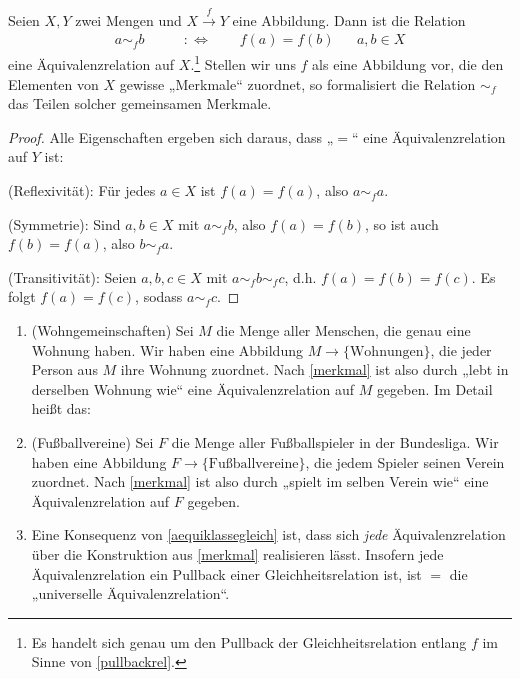 \begin{bem} \label{merkmal}
    Seien $X,Y$ zwei Mengen und $X\xrightarrow{f} Y$ eine Abbildung. Dann ist die Relation
    \begin{align*}
        a \sim_f b \qquad&:\Leftrightarrow\qquad f(a)=f(b) && a,b\in X
    \end{align*}
    eine Äquivalenzrelation auf $X$.\footnote{Es handelt sich genau um den Pullback der Gleichheitsrelation entlang $f$ im Sinne von \cref{pullbackrel}.} Stellen wir uns $f$ als eine Abbildung vor, die den Elementen von $X$ gewisse „Merkmale“ zuordnet, so formalisiert die Relation $\sim_f$ das Teilen solcher gemeinsamen Merkmale.
\end{bem}
\begin{proof}
    Alle Eigenschaften ergeben sich daraus, dass „$=$“ eine Äquivalenzrelation auf $Y$ ist:

    (Reflexivität): Für jedes $a\in X$ ist $f(a)=f(a)$, also $a\sim_f a$.

    (Symmetrie): Sind $a,b\in X$ mit $a\sim_f b$, also $f(a)=f(b)$, so ist auch $f(b)=f(a)$, also $b\sim_f a$.

    (Transitivität): Seien $a,b,c\in X$ mit $a\sim_f b\sim_f c$, d.h. $f(a)=f(b)=f(c)$. Es folgt $f(a)=f(c)$, sodass $a\sim_f c$.
\end{proof}


\begin{bsp} \quad
    \begin{enumerate}
        \item(Wohngemeinschaften) Sei $M$ die Menge aller Menschen, die genau eine Wohnung haben. Wir haben eine Abbildung $M\to \{\text{Wohnungen}\}$, die jeder Person aus $M$ ihre Wohnung zuordnet. Nach \cref{merkmal} ist also durch „lebt in derselben Wohnung wie“ eine Äquivalenzrelation auf $M$ gegeben. Im Detail heißt das:
        \item(Fußballvereine) Sei $F$ die Menge aller Fußballspieler in der Bundesliga. Wir haben eine Abbildung $F\to\{\text{Fußballvereine}\}$, die jedem Spieler seinen Verein zuordnet. Nach \cref{merkmal} ist also durch „spielt im selben Verein wie“ eine Äquivalenzrelation auf $F$ gegeben.
        \item Eine Konsequenz von \cref{aequiklassegleich} ist, dass sich \emph{jede} Äquivalenzrelation über die Konstruktion aus \cref{merkmal} realisieren lässt. Insofern jede Äquivalenzrelation ein Pullback einer Gleichheitsrelation ist, ist $=$ die „universelle Äquivalenzrelation“.
    \end{enumerate}
\end{bsp}


